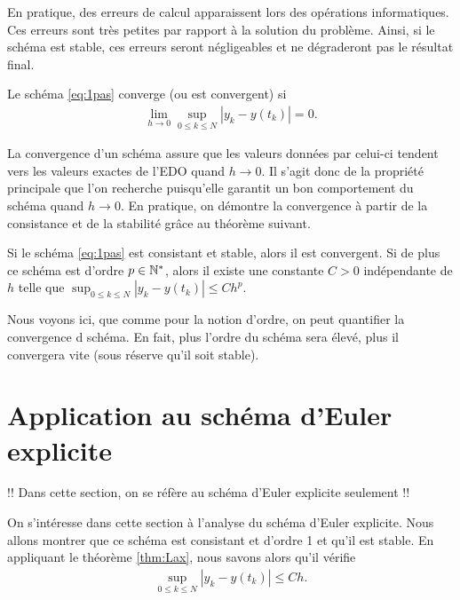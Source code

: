 \documentclass[12pt,a4paper,twoside]{article}
\begin{document}
En pratique, des erreurs de calcul apparaissent lors des op\'erations informatiques.
Ces erreurs sont tr\`es petites par rapport \`a la solution du probl\`eme.
Ainsi, si le sch\'ema est stable, ces erreurs seront n\'egligeables et ne d\'egraderont
pas le r\'esultat final.


\begin{definition}[Convergence]
  Le sch\'ema \eqref{eq:1pas} converge (ou est convergent) si
  \begin{align*}
    \lim_{h \to 0} \sup_{0 \leq k \leq N} | y_k - y(t_k) | = 0 .
  \end{align*}
\end{definition}

La convergence d'un sch\'ema assure que les valeurs donn\'ees par celui-ci
tendent vers les valeurs exactes de l'EDO quand $h \to 0$.
Il s'agit donc de la propri\'et\'e principale que l'on recherche puisqu'elle
garantit un bon comportement du sch\'ema quand $h \to 0$.
En pratique, on d\'emontre la convergence \`a partir de la consistance
et de la stabilit\'e gr\^ace au th\'eor\`eme suivant.

\begin{theorem}
  \label{thm:Lax}
  Si le sch\'ema \eqref{eq:1pas} est consistant et stable, alors il est convergent.
  Si de plus ce sch\'ema est d'ordre $p \in \mathbb{N}^*$, alors il existe une constante $C>0$
  ind\'ependante de $h$ telle que
  $\sup_{0 \leq k \leq N} | y_k - y(t_k) | \leq C h^p$.
\end{theorem}

Nous voyons ici, que comme pour la notion d'ordre, on peut quantifier la convergence d sch\'ema.
En fait, plus l'ordre du sch\'ema sera \'elev\'e, plus il convergera vite (sous r\'eserve qu'il soit stable).

\section{Application au sch\'ema d'Euler explicite}

!! Dans cette section, on se r\'ef\`ere au sch\'ema d'Euler explicite seulement !!

On s'int\'eresse dans cette section \`a l'analyse du sch\'ema d'Euler explicite.
Nous allons montrer que ce sch\'ema est consistant et d'ordre 1 et qu'il est stable.
En appliquant le th\'eor\`eme \ref{thm:Lax}, nous savons alors qu'il v\'erifie
\begin{align*}
  \sup_{0 \leq k \leq N} | y_k - y(t_k) | \leq C h .
\end{align*}
\end{document}
